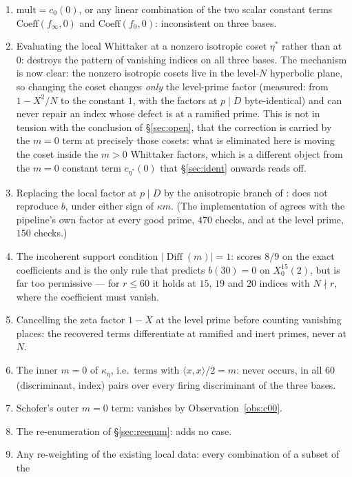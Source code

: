 \documentclass[11pt,reqno]{amsart}
\theoremstyle{plain}
\theoremstyle{definition}
\DeclareMathOperator{\Diff}{Diff}
\begin{document}
\begin{enumerate}
\item $\mathrm{mult}=c_0(0)$, or any linear combination of the two scalar constant terms
      $\mathrm{Coeff}(f_\infty,0)$ and $\mathrm{Coeff}(f_0,0)$: inconsistent on three bases.
\item Evaluating the local Whittaker at a nonzero isotropic coset $\eta^*$ rather than at $0$:
      destroys the pattern of vanishing indices on all three bases. The mechanism is now clear:
      the nonzero isotropic cosets live in the level-$N$ hyperbolic plane, so changing the coset
      changes \emph{only} the level-prime factor (measured: from $1-X^2/N$ to the constant $1$,
      with the factors at $p\mid D$ byte-identical) and can never repair an index whose defect is
      at a ramified prime. This is not in tension with the conclusion of \S\ref{sec:open}, that
      the correction is carried by the $m=0$ term at precisely those cosets: what is eliminated
      here is moving the coset inside the $m>0$ Whittaker factors, which is a different object
      from the $m=0$ constant term $c_{\eta^*}(0)$ that \S\ref{sec:ident} onwards reads off.
\item Replacing the local factor at $p\mid D$ by the anisotropic branch of \cite[Prop.~5.3]{KY}:
      does not reproduce $b$, under either sign of $\kappa m$. (The implementation of
      \cite[Props.~5.3, 5.4]{KY} agrees with the pipeline's own factor at every good prime,
      $470$ checks, and at the level prime, $150$ checks.)
\item The incoherent support condition $\lvert\Diff(m)\rvert=1$: scores $8/9$ on the exact
      coefficients and is the only rule that predicts $b(30)=0$ on $X_0^{15}(2)$, but is far too
      permissive --- for $r\le 60$ it holds at $15$, $19$ and $20$ indices with $N\nmid r$, where
      the coefficient must vanish.
\item Cancelling the zeta factor $1-X$ at the level prime before counting vanishing places: the
      recovered terms differentiate at ramified and inert primes, never at $N$.
\item The inner $m=0$ of $\kappa_\eta$, i.e.\ terms with $\langle x,x\rangle/2=m$: never occurs, in
      all $60$ (discriminant, index) pairs over every firing discriminant of the three bases.
\item Schofer's outer $m=0$ term: vanishes by Observation~\ref{obs:c00}.
\item The re-enumeration of \S\ref{sec:reenum}: adds no case.
\item Any re-weighting of the existing local data: every combination of a subset of the

\end{enumerate}
\end{document}
